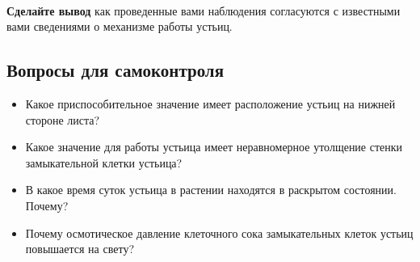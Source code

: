 \paragraph*{}\textbf{Сделайте вывод} как проведенные вами наблюдения согласуются с известными вами сведениями о механизме работы устьиц.

\subsection*{Вопросы для самоконтроля}

\begin{itemize}
	\item Какое приспособительное значение имеет расположение устьиц на нижней стороне листа?
	\item Какое значение для работы устьица имеет неравномерное утолщение стенки замыкательной клетки устьица?
	\item В какое время суток устьица в растении находятся в раскрытом состоянии. Почему?
	\item Почему осмотическое давление клеточного сока замыкательных клеток устьиц повышается на свету?
\end{itemize}

